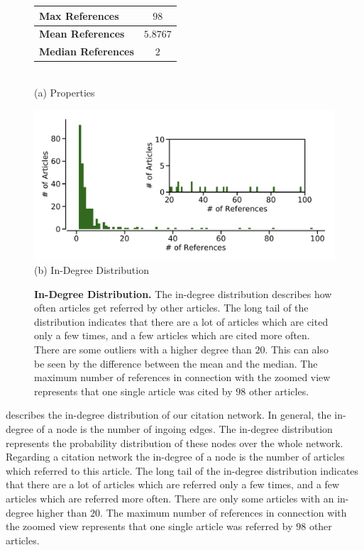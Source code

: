 \begin{figure}[!t]
  \begin{minipage}{\textwidth}
    \begin{minipage}[b]{0.39\textwidth}
      \centering
      \begin{tabular}{ l c }
        \toprule
        \textbf{Max References}    & $98$     \\ \midrule
        \textbf{Mean References}   & $5.8767$ \\ \midrule
        \textbf{Median References} & $2$      \\
        \bottomrule
    \end{tabular} \\
    \vspace*{1cm}
    (a) Properties
  \end{minipage}
  \begin{minipage}[b]{0.59\textwidth}
    \centering
    \includegraphics[width=1.0\textwidth]{figures/in-degree_distribution} \\
    (b) In-Degree Distribution
    \end{minipage}
  \end{minipage}
  \caption[In-Degree Distribution of the Citation Network]{\textbf{In-Degree Distribution.} The in-degree distribution describes how often articles get referred by other articles. The long tail of the distribution indicates that there are a lot of articles which are cited only a few times, and a few articles which are cited more often. There are some outliers with a higher degree than $20$. This can also be seen by the difference between the mean and the median. The maximum number of references in connection with the zoomed view represents that one single article was cited by $98$ other articles.}
  \label{fig:indegree_distribution}
\end{figure}

 describes the in-degree distribution of our citation network. In general, the in-degree of a node is the number of ingoing edges. The in-degree distribution represents the probability distribution of these nodes over the whole network. Regarding a citation network the in-degree of a node is the number of articles which referred to this article. The long tail of the in-degree distribution indicates that there are a lot of articles which are referred only a few times, and a few articles which are referred more often. There are only some articles with an in-degree higher than $20$. The maximum number of references in connection with the zoomed view represents that one single article was referred by $98$ other articles.


